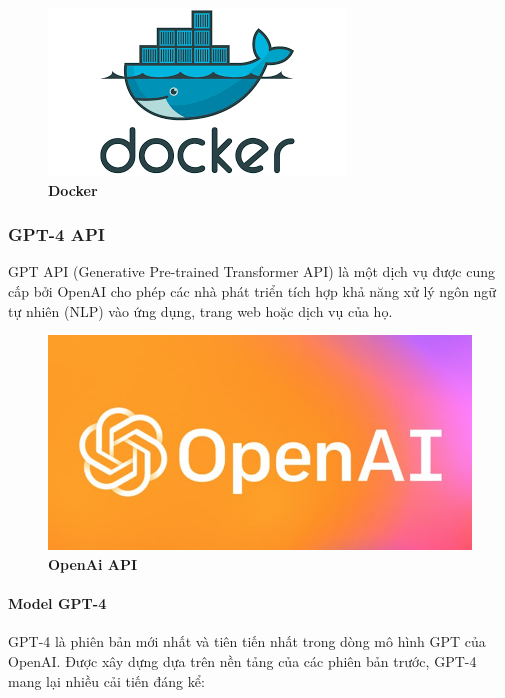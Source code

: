 \begin{figure}[H]
  \centering
  \includegraphics[scale=0.8]{Images/server/deploy/docker.png}
  \caption[Docker]{\bfseries \fontsize{12pt}{0pt}
  \selectfont Docker}
  \label{docker} %
\end{figure}


\subsubsection{GPT-4 API}
\mbox{}

GPT API (Generative Pre-trained Transformer API) 
là một dịch vụ được cung cấp bởi OpenAI cho phép các nhà phát triển tích hợp khả năng xử lý ngôn ngữ tự nhiên (NLP) vào ứng dụng, 
trang web hoặc dịch vụ của họ. 

\begin{figure}[H]
  \centering
  \includegraphics[scale=0.9]{Images/server/ai/openai.png}
  \caption[OpenAi API]{\bfseries \fontsize{12pt}{0pt}
  \selectfont OpenAi API}
  \label{openai} %
\end{figure}

\paragraph{Model GPT-4}
\mbox{}

GPT-4 là phiên bản mới nhất và tiên tiến nhất trong dòng mô hình GPT của OpenAI. 
Được xây dựng dựa trên nền tảng của các phiên bản trước, 
GPT-4 mang lại nhiều cải tiến đáng kể:

